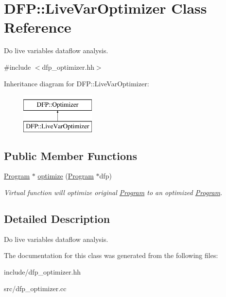 \hypertarget{class_d_f_p_1_1_live_var_optimizer}{}\section{D\+FP\+:\+:Live\+Var\+Optimizer Class Reference}
\label{class_d_f_p_1_1_live_var_optimizer}


Do live variables dataflow analysis.  




{\ttfamily \#include $<$dfp\+\_\+optimizer.\+hh$>$}

Inheritance diagram for D\+FP\+:\+:Live\+Var\+Optimizer\+:\begin{figure}[H]
\begin{center}
\leavevmode
\includegraphics[height=2.000000cm]{class_d_f_p_1_1_live_var_optimizer}
\end{center}
\end{figure}
\subsection*{Public Member Functions}
\begin{DoxyCompactItemize}
\item 
\hyperlink{class_d_f_p_1_1_program}{Program} $\ast$ \hyperlink{class_d_f_p_1_1_live_var_optimizer_a871bc1d15a7f5911a1f040d2baea4ffc}{optimize} (\hyperlink{class_d_f_p_1_1_program}{Program} $\ast$dfp)\hypertarget{class_d_f_p_1_1_live_var_optimizer_a871bc1d15a7f5911a1f040d2baea4ffc}{}\label{class_d_f_p_1_1_live_var_optimizer_a871bc1d15a7f5911a1f040d2baea4ffc}

\begin{DoxyCompactList}\small\item\em Virtual function will optimize original \hyperlink{class_d_f_p_1_1_program}{Program} to an optimized \hyperlink{class_d_f_p_1_1_program}{Program}. \end{DoxyCompactList}\end{DoxyCompactItemize}


\subsection{Detailed Description}
Do live variables dataflow analysis. 

The documentation for this class was generated from the following files\+:\begin{DoxyCompactItemize}
\item 
include/dfp\+\_\+optimizer.\+hh\item 
src/dfp\+\_\+optimizer.\+cc\end{DoxyCompactItemize}
